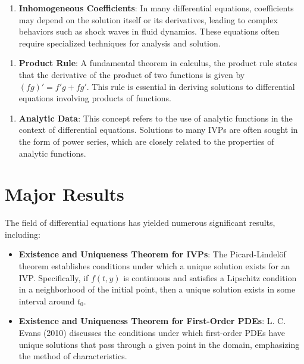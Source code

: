 \documentclass[11pt,a4paper]{article}
\begin{document}
\begin{enumerate}
\item \textbf{Inhomogeneous Coefficients}: In many differential equations, coefficients may depend on the solution itself or its derivatives, leading to complex behaviors such as shock waves in fluid dynamics. These equations often require specialized techniques for analysis and solution.
\end{enumerate}

\begin{enumerate}
\item \textbf{Product Rule}: A fundamental theorem in calculus, the product rule states that the derivative of the product of two functions is given by \( (fg)' = f'g + fg' \). This rule is essential in deriving solutions to differential equations involving products of functions.
\end{enumerate}

\begin{enumerate}
\item \textbf{Analytic Data}: This concept refers to the use of analytic functions in the context of differential equations. Solutions to many IVPs are often sought in the form of power series, which are closely related to the properties of analytic functions.
\end{enumerate}

\section{Major Results}

The field of differential equations has yielded numerous significant results, including:

\begin{itemize}
\item \textbf{Existence and Uniqueness Theorem for IVPs}: The Picard-Lindelöf theorem establishes conditions under which a unique solution exists for an IVP. Specifically, if \( f(t, y) \) is continuous and satisfies a Lipschitz condition in a neighborhood of the initial point, then a unique solution exists in some interval around \( t_0 \).
\end{itemize}

\begin{itemize}
\item \textbf{Existence and Uniqueness Theorem for First-Order PDEs}: L. C. Evans (2010) discusses the conditions under which first-order PDEs have unique solutions that pass through a given point in the domain, emphasizing the method of characteristics.
\end{itemize}
\end{document}
